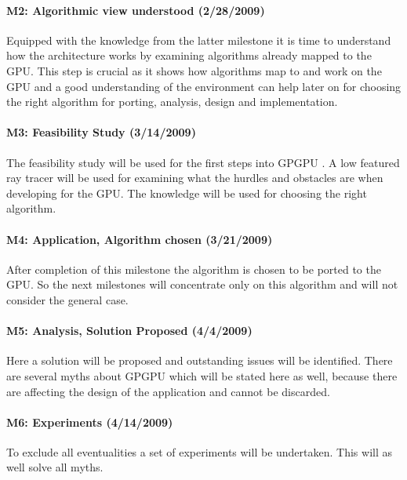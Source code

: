 \paragraph{M2: Algorithmic view understood (2/28/2009)} %
\label{par:m2_architecture_algorithmic_view_understood}
Equipped with the knowledge from the latter milestone it is time to understand
how the architecture works by examining algorithms already mapped to the \gls{GPU}.
This step is crucial as it shows how algorithms map to and work on the \gls{GPU}
and a good understanding of the environment can help later on for choosing the
right algorithm for porting, analysis, design and implementation.
\paragraph{M3: Feasibility Study (3/14/2009)} %
\label{par:m3_feasibility_study}
The feasibility study will be used for the first steps into \gls{GPGPU} . A low featured
ray tracer will be used for examining what the hurdles and obstacles are when 
developing for the \gls{GPU}. The knowledge will be used for choosing the right 
algorithm. 
\paragraph{M4: Application, Algorithm chosen (3/21/2009)} %
\label{par:m4_application_algorithm_choosen}
After completion of this milestone the algorithm is chosen to be ported to the 
\gls{GPU}. So the next milestones will concentrate only on this algorithm and will
not consider the general case. 
\paragraph{M5: Analysis, Solution Proposed (4/4/2009)} %
\label{par:m5_analysis_solution_proposed}
Here a solution will be proposed and outstanding issues will be identified. 
There are several myths about \gls{GPGPU}  which will be stated here as well, because 
there are affecting the design of the application and cannot be discarded.
\paragraph{M6: Experiments (4/14/2009)} %
\label{par:m6_experiments}
To exclude all eventualities a set of experiments will be undertaken. This will 
as well solve all myths.

